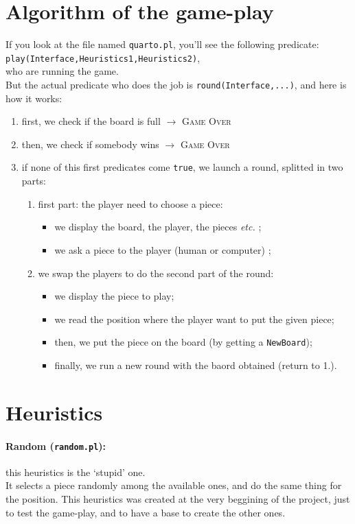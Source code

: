\documentclass[a4paper,11pt]{article}
\newcommand{\tw}[1]{\texttt{#1}}
\begin{document}
	\section{Algorithm of the game-play}
		If you look at the file named \tw{quarto.pl}, you'll see the following predicate:\\
			\tw{play(Interface,Heuristics1,Heuristics2)},\\
		who are running the game. \\
		But the actual predicate who does the job is \tw{round(Interface,...)}, and here is how it works:
		\begin{enumerate}
			\item first, we check if the board is full $\rightarrow$ \textsc{Game Over}
			\item then, we check if somebody wins $\rightarrow$ \textsc{Game Over}
			\item if none of this first predicates come \tw{true}, we launch a round, splitted in two parts:
			\begin{enumerate}
				\item first part: the player need to choose a piece:
				\begin{itemize}
					\item we display the board, the player, the pieces \textit{etc.} ;
					\item we ask a piece to the player (human or computer) ;
				\end{itemize}
				\item we swap the players to do the second part of the round:
				\begin{itemize}
					\item we display the piece to play;
					\item we read the position where the player want to put the given piece;
					\item then, we put the piece on the board (by getting a \tw{NewBoard});
					\item finally, we run a new round with the baord obtained (return to 1.).
				\end{itemize}
			\end{enumerate}
		\end{enumerate}

	\section{Heuristics}
		\paragraph{Random (\tw{random.pl}):} this heuristics is the `stupid' one. \\
		It selects a piece randomly among the available ones, and do the same thing for the position. This heuristics was created at the very beggining of the project, just to test the game-play, and to have a base to create the other ones.
		
\end{document}
